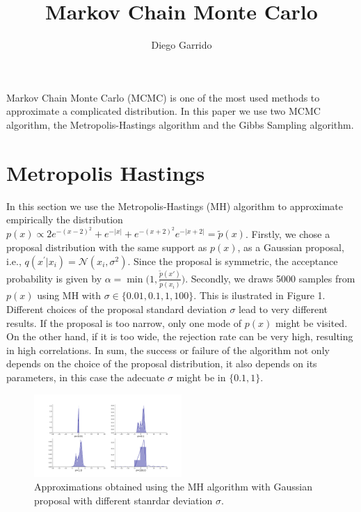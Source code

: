 \documentclass{article}
\title{Markov Chain Monte Carlo}
\author{Diego Garrido}
\begin{document}
\maketitle

Markov Chain Monte Carlo (MCMC) is one of the most used methods to approximate a complicated distribution. In this paper we use two MCMC algorithm, the Metropolis-Hastings algorithm and the Gibbs Sampling algorithm.

\href{https://nbviewer.jupyter.org/github/dgarridoa/MCMC_Py/blob/main/MCMC.ipynb}{\color{blue}{Jupyter Notebook}}

\section{Metropolis Hastings}

In this section we use the Metropolis-Hastings (MH) algorithm to approximate empirically the distribution $p(x) \propto 2e^{-(x-2)^{2}}+e^{-|x|}+e^{-(x+2)^{2}}e^{-|x+2|}=\tilde{p}(x)$. Firstly, we chose a proposal distribution with the same support as $p(x)$, as a Gaussian proposal, i.e., $q(x^{'}|x_{i})=\mathcal{N}(x_{i}, \sigma^{2})$. Since the proposal is symmetric, the acceptance probability is given by $\alpha=\min\big(1, \frac{\tilde{p}(x')}{\tilde{p}(x_{i})}\big)$. Secondly, we draws 5000 samples from $p(x)$ using MH with $\sigma\in\{0.01, 0.1, 1, 100\}$. This is ilustrated in Figure 1. Different choices of the proposal standard deviation $\sigma$ lead to very different results. If the proposal is too narrow, only one mode of $p(x)$ might be visited. On the other hand, if it is too wide, the rejection rate can be very high, resulting in high correlations. In sum, the success or failure of the algorithm not only depends on the choice of the proposal distribution, it also depends on its parameters, in this case the adecuate $\sigma$ might be in $\{0.1, 1\}$. 

\begin{figure}[!h]
    \includegraphics[width=0.5\textwidth]{img/metrepolis_hastings.pdf} 
    \caption{Approximations obtained using the MH algorithm with Gaussian proposal with different stanrdar deviation $\sigma$.}
\end{figure}
\end{document}
